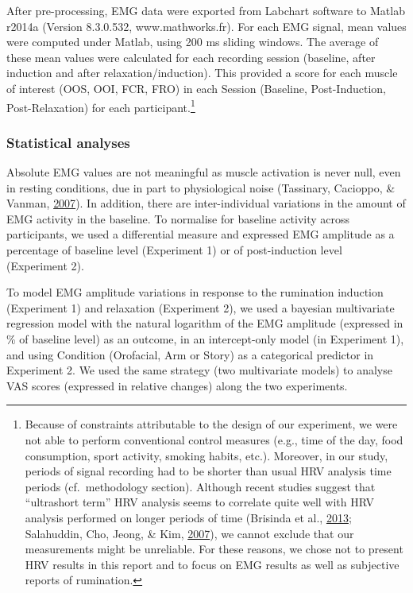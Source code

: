 \documentclass[a4paper,12pt,twoside,openright,oldfontcommands,final]{memoir}
\let\rmarkdownfootnote\footnote%
\def\footnote{\protect\rmarkdownfootnote}
\begin{document}
After pre-processing, EMG data were exported from Labchart software to Matlab r2014a (Version 8.3.0.532, www.mathworks.fr). For each EMG signal, mean values were computed under Matlab, using 200 ms sliding windows. The average of these mean values were calculated for each recording session (baseline, after induction and after relaxation/induction). This provided a score for each muscle of interest (OOS, OOI, FCR, FRO) in each Session (Baseline, Post-Induction, Post-Relaxation) for each participant.\footnote{Because of constraints attributable to the design of our experiment, we were not able to perform conventional control measures (e.g., time of the day, food consumption, sport activity, smoking habits, etc.). Moreover, in our study, periods of signal recording had to be shorter than usual HRV analysis time periods (cf.~methodology section). Although recent studies suggest that \enquote{ultrashort term} HRV analysis seems to correlate quite well with HRV analysis performed on longer periods of time (Brisinda et al., \protect\hyperlink{ref-brisinda_comparison_2013}{2013}; Salahuddin, Cho, Jeong, \& Kim, \protect\hyperlink{ref-Salahuddin2007}{2007}), we cannot exclude that our measurements might be unreliable. For these reasons, we chose not to present HRV results in this report and to focus on EMG results as well as subjective reports of rumination.}

\hypertarget{statistical-analyses}{%
\subsubsection{Statistical analyses}\label{statistical-analyses}}

Absolute EMG values are not meaningful as muscle activation is never null, even in resting conditions, due in part to physiological noise (Tassinary, Cacioppo, \& Vanman, \protect\hyperlink{ref-berntson_skeletomotor_2007}{2007}). In addition, there are inter-individual variations in the amount of EMG activity in the baseline. To normalise for baseline activity across participants, we used a differential measure and expressed EMG amplitude as a percentage of baseline level (Experiment 1) or of post-induction level (Experiment 2).

To model EMG amplitude variations in response to the rumination induction (Experiment 1) and relaxation (Experiment 2), we used a bayesian multivariate regression model with the natural logarithm of the EMG amplitude (expressed in \% of baseline level) as an outcome, in an intercept-only model (in Experiment 1), and using Condition (Orofacial, Arm or Story) as a categorical predictor in Experiment 2. We used the same strategy (two multivariate models) to analyse VAS scores (expressed in relative changes) along the two experiments.
\end{document}
